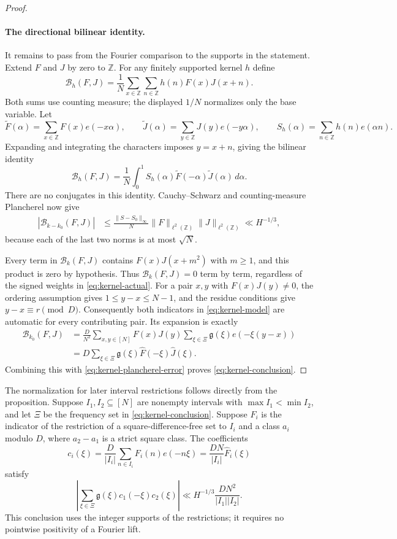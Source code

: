 \begin{proof}
\paragraph{The directional bilinear identity.}
It remains to pass from the Fourier comparison to the supports in the
statement. Extend $F$ and $J$ by zero to $\mathbb Z$.
For any finitely supported kernel $h$ define
\[
 \mathcal B_h(F,J)=\frac1N\sum_{x\in\mathbb Z}
                              \sum_{n\in\mathbb Z}h(n)F(x)J(x+n).
\]
Both sums use counting measure; the displayed $1/N$ normalizes only
the base variable. Let
\[
 \widetilde F(\alpha)=\sum_{x\in\mathbb Z}F(x)e(-x\alpha),
 \qquad
 \widetilde J(\alpha)=\sum_{y\in\mathbb Z}J(y)e(-y\alpha),
 \qquad
 S_h(\alpha)=\sum_{n\in\mathbb Z}h(n)e(\alpha n).
\]
Expanding and integrating the characters imposes $y=x+n$, giving
the bilinear identity
\[
 \mathcal B_h(F,J)=\frac1N\int_0^1
 S_h(\alpha)\widetilde F(-\alpha)\widetilde J(\alpha)\,d\alpha.
\]
There are no conjugates in this identity.
Cauchy--Schwarz and counting-measure Plancherel now give
\begin{align}
 |\mathcal B_{k-k_0}(F,J)|
 &\le\frac{\|S-S_0\|_\infty}{N}
          \|F\|_{\ell^2(\mathbb Z)}\|J\|_{\ell^2(\mathbb Z)}
 \ll H^{-1/3},
 \label{eq:kernel-plancherel-error}
\end{align}
because each of the last two norms is at most $\sqrt N$.

Every term in $\mathcal B_k(F,J)$ contains $F(x)J(x+m^2)$ with
$m\ge1$, and this product is zero by hypothesis.
Thus $\mathcal B_k(F,J)=0$ term by term, regardless of the signed
weights in \eqref{eq:kernel-actual}.
For a pair $x,y$ with $F(x)J(y)\ne0$, the ordering assumption gives
$1\le y-x\le N-1$, and the residue conditions give
$y-x\equiv r\pmod D$.
Consequently both indicators in \eqref{eq:kernel-model} are automatic
for every contributing pair. Its expansion is exactly
\begin{align*}
 \mathcal B_{k_0}(F,J)
 &=\frac{D}{N^2}\sum_{x,y\in[N]}F(x)J(y)
                    \sum_{\xi\in\Xi}\mathfrak g(\xi)e(-\xi(y-x))\\
 &=D\sum_{\xi\in\Xi}\mathfrak g(\xi)
                    \widehat F(-\xi)\widehat J(\xi).
\end{align*}
Combining this with \eqref{eq:kernel-plancherel-error} proves
\eqref{eq:kernel-conclusion}.
\end{proof}

\begin{remark}
\label{rem:kernel-interval-normalization}
The normalization for later interval restrictions follows directly
from the proposition. Suppose $I_1,I_2\subseteq[N]$ are nonempty
intervals with $\max I_1<\min I_2$, and let $\Xi$ be the frequency
set in \eqref{eq:kernel-conclusion}. Suppose $F_i$ is the indicator of the restriction of a
square-difference-free set to $I_i$ and a class $a_i$ modulo $D$,
where $a_2-a_1$ is a strict square class. The coefficients
\[
 c_i(\xi)=\frac D{|I_i|}\sum_{n\in I_i}F_i(n)e(-n\xi)
          =\frac{DN}{|I_i|}\widehat F_i(\xi)
\]
satisfy
\[
 \left|\sum_{\xi\in\Xi}\mathfrak g(\xi)c_1(-\xi)c_2(\xi)\right|
 \ll H^{-1/3}\frac{DN^2}{|I_1||I_2|}.
\]
This conclusion uses the integer supports of the restrictions;
it requires no pointwise positivity of a Fourier lift.
\end{remark}
